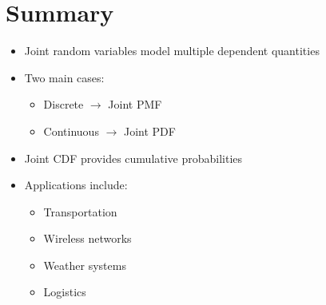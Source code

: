 \documentclass[11pt]{article}
\begin{document}
\section{Summary}

\begin{itemize}
    \item Joint random variables model multiple dependent quantities
    \item Two main cases:
    \begin{itemize}
        \item Discrete $\rightarrow$ Joint PMF
        \item Continuous $\rightarrow$ Joint PDF
    \end{itemize}
    \item Joint CDF provides cumulative probabilities
    \item Applications include:
    \begin{itemize}
        \item Transportation
        \item Wireless networks
        \item Weather systems
        \item Logistics
    \end{itemize}
\end{itemize}
\end{document}
